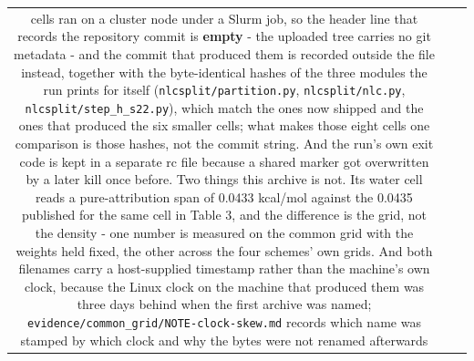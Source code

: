 \documentclass[11pt]{article}
\begin{document}
\begin{longtable}{c>{\raggedright\arraybackslash}p{}>{\raggedright\arraybackslash}p{}}
cells ran on a cluster node under a Slurm job, so the header line that records the repository commit is \textbf{empty} - the uploaded tree carries no git metadata - and the commit that produced them is recorded outside the file instead, together with the byte-identical hashes of the three modules the run prints for itself (\texttt{nlcsplit/partition.py}, \texttt{nlcsplit/nlc.py}, \texttt{nlcsplit/step\_h\_s22.py}), which match the ones now shipped and the ones that produced the six smaller cells; what makes those eight cells one comparison is those hashes, not the commit string. And the run's own exit code is kept in a separate rc file because a shared marker got overwritten by a later kill once before. Two things this archive is not. Its water cell reads a pure-attribution span of 0.0433 kcal/mol against the 0.0435 published for the same cell in Table 3, and the difference is the grid, not the density - one number is measured on the common grid with the weights held fixed, the other across the four schemes' own grids. And both filenames carry a host-supplied timestamp rather than the machine's own clock, because the Linux clock on the machine that produced them was three days behind when the first archive was named; \texttt{evidence/\allowbreak{}common\_\allowbreak{}grid/\allowbreak{}NOTE-clock-skew.md} records which name was stamped by which clock and why the bytes were not renamed afterwards \\

\end{longtable}
\end{document}
